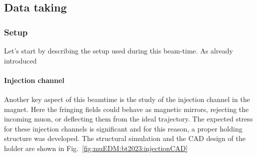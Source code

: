 \begin{refsection}
    \subsection{Data taking}
    \subsubsection{Setup}
        Let's start by describing the setup used during this beam-time.
        As already introduced 

        \paragraph{Injection channel}
        Another key aspect of this beamtime is the study of the injection channel in the magnet. 
        Here the fringing fields could behave as magnetic mirrors, rejecting the incoming muon, or deflecting them from the ideal trajectory.
        The expected stress for these injection channels is significant and for this reason, a proper holding structure was developed.
        The \ansys structural simulation and the CAD design of the holder are shown in Fig.~\ref{fig:muEDM:bt2023:injectionCAD}
        

\end{refsection}
